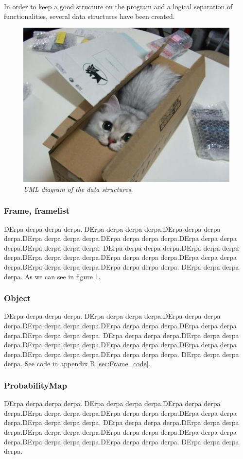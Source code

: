 In order to keep a good structure on the program and a logical separation of functionalities, several data structures have been created.

\begin{figure}[htb]
	\centering
	\includegraphics[width=\linewidth]{images/acatisfinetoo}
	\caption{\textit{UML diagram of the data structures.}}
	\label{fig:UML_fig} %
\end{figure}

\subsubsection{Frame, framelist}
DErpa derpa derpa derpa. DErpa derpa derpa derpa.DErpa derpa derpa derpa.DErpa derpa derpa derpa.DErpa derpa derpa derpa.DErpa derpa derpa derpa.DErpa derpa derpa derpa.
DErpa derpa derpa derpa.DErpa derpa derpa derpa.DErpa derpa derpa derpa.DErpa derpa derpa derpa.DErpa derpa derpa derpa.DErpa derpa derpa derpa.DErpa derpa derpa derpa.
DErpa derpa derpa derpa. As we can see in figure \ref{fig:UML_fig}. %

\subsubsection{Object}
DErpa derpa derpa derpa. DErpa derpa derpa derpa.DErpa derpa derpa derpa.DErpa derpa derpa derpa.DErpa derpa derpa derpa.DErpa derpa derpa derpa.DErpa derpa derpa derpa.
DErpa derpa derpa derpa.DErpa derpa derpa derpa.DErpa derpa derpa derpa.DErpa derpa derpa derpa.DErpa derpa derpa derpa.DErpa derpa derpa derpa.DErpa derpa derpa derpa.
DErpa derpa derpa derpa. See code in appendix B \ref{sec:Frame_code}.

\subsubsection{ProbabilityMap}
DErpa derpa derpa derpa. DErpa derpa derpa derpa.DErpa derpa derpa derpa.DErpa derpa derpa derpa.DErpa derpa derpa derpa.DErpa derpa derpa derpa.DErpa derpa derpa derpa.
DErpa derpa derpa derpa.DErpa derpa derpa derpa.DErpa derpa derpa derpa.DErpa derpa derpa derpa.DErpa derpa derpa derpa.DErpa derpa derpa derpa.DErpa derpa derpa derpa.
DErpa derpa derpa derpa.
